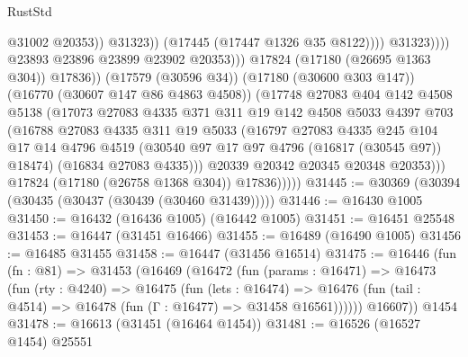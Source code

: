 \begin{lexlean}{RustStd}
\begin{coremodule}
{\begin{coremodule}
{{{{{{{{{{{{{{{{{{{{{{{{{{{{{{{{{{{{{{{{{{{{{{{{{{{{{{{                                              @31002
                                              @20353))
                                          @31323))
                                      (@17445 (@17447 @1326 @35 @8122))))
                                  @31323))))
                          @23893
                          @23896
                          @23899
                          @23902
                          @20353)))
                    @17824
                    (@17180 (@26695 @1363 @304))
                    @17836))
                (@17579 (@30596 @34))
                (@17180 (@30600 @303 @147))
                (@16770 (@30607 @147 @86 @4863 @4508))
                (@17748
                  @27083
                  @404
                  @142
                  @4508
                  @5138
                  (@17073
                    @27083
                    @4335
                    @371
                    @311
                    @19
                    @142
                    @4508
                    @5033
                    @4397
                    @703
                    (@16788
                      @27083
                      @4335
                      @311
                      @19
                      @5033
                      (@16797
                        @27083
                        @4335
                        @245
                        @104
                        @17
                        @14
                        @4796
                        @4519
                        (@30540 @97 @17 @97 @4796 (@16817 (@30545 @97)) @18474)
                        (@16834 @27083 @4335)))
                    @20339
                    @20342
                    @20345
                    @20348
                    @20353)))
              @17824
              (@17180 (@26758 @1368 @304))
              @17836)))))
@31445 := @30369 (@30394 (@30435 (@30437 (@30439 (@30460 @31439)))))
@31446 := @16430 @1005
@31450 := @16432 (@16436 @1005) (@16442 @1005)
@31451 := @16451 @25548
@31453 := @16447 (@31451 @16466)
@31455 := @16489 (@16490 @1005)
@31456 := @16485 @31455
@31458 := @16447 (@31456 @16514)
@31475 := @16446
    (fun (fn : @81) =>
    @31453
      (@16469
        (@16472
          (fun (params : @16471) =>
          @16473
            (fun (rty : @4240) =>
            @16475
              (fun (lets : @16474) =>
              @16476 (fun (tail : @4514) => @16478 (fun (Γ : @16477) => @31458 @16561))))))
        @16607))
    @1454
@31478 := @16613 (@31451 (@16464 @1454))
@31481 := @16526 (@16527 @1454) @25551
}}}}}}}}}}}}}}}}}}}}}}}}}}}}}}}}}}}}}}}}}}}}}}}}}}}}}}}
\end{coremodule}}
\end{coremodule}
\end{lexlean}
